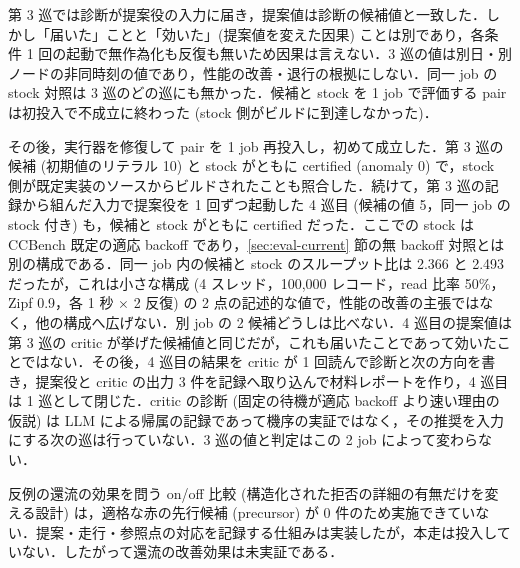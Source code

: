 \documentclass[submit,techrep,noauthor]{ipsj}
\begin{document}
第 3 巡では診断が提案役の入力に届き，提案値は診断の候補値と一致した．しかし「届いた」ことと「効いた」(提案値を変えた因果) ことは別であり，各条件 1 回の起動で無作為化も反復も無いため因果は言えない．3 巡の値は別日・別ノードの非同時刻の値であり，性能の改善・退行の根拠にしない．同一 job の stock 対照は 3 巡のどの巡にも無かった．候補と stock を 1 job で評価する pair は初投入で不成立に終わった (stock 側がビルドに到達しなかった)．

その後，実行器を修復して pair を 1 job 再投入し，初めて成立した．第 3 巡の候補 (初期値のリテラル 10) と stock がともに certified (anomaly 0) で，stock 側が既定実装のソースからビルドされたことも照合した．続けて，第 3 巡の記録から組んだ入力で提案役を 1 回ずつ起動した 4 巡目 (候補の値 5，同一 job の stock 付き) も，候補と stock がともに certified だった．ここでの stock は CCBench 既定の適応 backoff であり，\ref{sec:eval-current} 節の無 backoff 対照とは別の構成である．同一 job 内の候補と stock のスループット比は 2.366 と 2.493 だったが，これは小さな構成 (4 スレッド，100,000 レコード，read 比率 50\%，Zipf 0.9，各 1 秒 $\times$ 2 反復) の 2 点の記述的な値で，性能の改善の主張ではなく，他の構成へ広げない．別 job の 2 候補どうしは比べない．4 巡目の提案値は第 3 巡の critic が挙げた候補値と同じだが，これも届いたことであって効いたことではない．その後，4 巡目の結果を critic が 1 回読んで診断と次の方向を書き，提案役と critic の出力 3 件を記録へ取り込んで材料レポートを作り，4 巡目は 1 巡として閉じた．critic の診断 (固定の待機が適応 backoff より速い理由の仮説) は LLM による帰属の記録であって機序の実証ではなく，その推奨を入力にする次の巡は行っていない．3 巡の値と判定はこの 2 job によって変わらない．

反例の還流の効果を問う on/off 比較 (構造化された拒否の詳細の有無だけを変える設計) は，適格な赤の先行候補 (precursor) が 0 件のため実施できていない．提案・走行・参照点の対応を記録する仕組みは実装したが，本走は投入していない．したがって還流の改善効果は未実証である．
\end{document}
